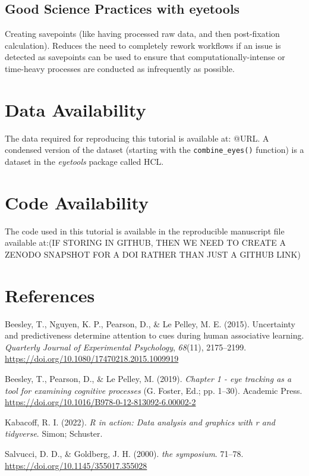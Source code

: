 \documentclass[
  man,
  floatsintext,
  longtable,
  nolmodern,
  notxfonts,
  notimes,
  colorlinks=true,linkcolor=blue,citecolor=blue,urlcolor=blue]{apa7}
\newlength{\cslhangindent}
\newenvironment{CSLReferences}[2] %
 {\begin{list}{}{%
  \setlength{\itemindent}{0pt}
  \setlength{\leftmargin}{0pt}
  \setlength{\parsep}{0pt}
  \ifodd #1
   \setlength{\leftmargin}{\cslhangindent}
   \setlength{\itemindent}{-1\cslhangindent}
  \fi
  \setlength{\itemsep}{#2\baselineskip}}}
 {\end{list}}
\begin{document}
\subsection{Good Science Practices with
eyetools}\label{good-science-practices-with-eyetools}

Creating savepoints (like having processed raw data, and then
post-fixation calculation). Reduces the need to completely rework
workflows if an issue is detected as savepoints can be used to ensure
that computationally-intense or time-heavy processes are conducted as
infrequently as possible.

\section{Data Availability}\label{data-availability}

The data required for reproducing this tutorial is available at: @URL. A
condensed version of the dataset (starting with the
\texttt{combine\_eyes()} function) is a dataset in the \emph{eyetools}
package called HCL.

\section{Code Availability}\label{code-availability}

The code used in this tutorial is available in the reproducible
manuscript file available at:(IF STORING IN GITHUB, THEN WE NEED TO
CREATE A ZENODO SNAPSHOT FOR A DOI RATHER THAN JUST A GITHUB LINK)

\section{References}\label{references}

\label{refs}
\begin{CSLReferences}{1}{0}
Beesley, T., Nguyen, K. P., Pearson, D., \& Le Pelley, M. E. (2015).
Uncertainty and predictiveness determine attention to cues during human
associative learning. \emph{Quarterly Journal of Experimental
Psychology}, \emph{68}(11), 2175--2199.
\url{https://doi.org/10.1080/17470218.2015.1009919}

Beesley, T., Pearson, D., \& Le Pelley, M. (2019). \emph{Chapter 1 - eye
tracking as a tool for examining cognitive processes} (G. Foster, Ed.;
pp. 1--30). Academic Press.
\url{https://doi.org/10.1016/B978-0-12-813092-6.00002-2}

Kabacoff, R. I. (2022). \emph{R in action: Data analysis and graphics
with r and tidyverse}. Simon; Schuster.

Salvucci, D. D., \& Goldberg, J. H. (2000). \emph{the symposium}.
71--78. \url{https://doi.org/10.1145/355017.355028}

\end{CSLReferences}
\end{document}

